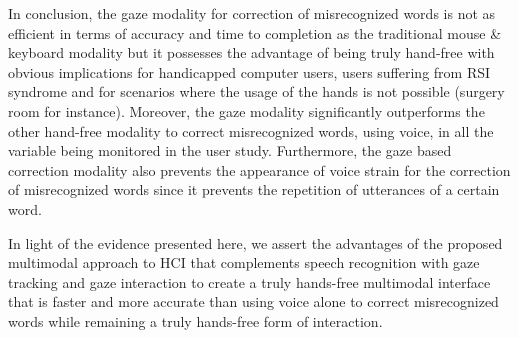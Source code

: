 \documentclass[]{article}
\begin{document}
In conclusion, the gaze modality for correction of misrecognized words is not as efficient in terms of accuracy and time
to completion as the traditional mouse \& keyboard modality but it possesses the advantage of being truly hand-free with
obvious  implications for handicapped computer users, users suffering from RSI syndrome and for scenarios where the
usage of the hands is not possible (surgery room for instance). Moreover, the gaze modality significantly outperforms
the other hand-free modality to correct misrecognized words, using voice, in all the variable being monitored in the
user study. Furthermore, the gaze based correction modality also prevents the appearance of voice strain for the correction
of misrecognized words since it prevents the  repetition of utterances of a certain word.


In light of the evidence presented here, we assert the advantages of the proposed multimodal approach to HCI that
complements speech recognition with gaze tracking and gaze interaction to create a truly hands-free multimodal interface that is
faster and more accurate than using voice alone to correct misrecognized words while remaining a truly hands-free form
of interaction.




\end{document}
